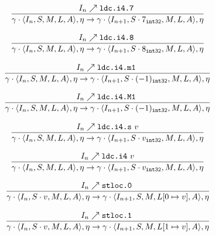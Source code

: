 \documentclass{article}
\numberwithin{equation}{section}
\newcommand{\mstate}[5] {
	\langle#1, #2, #3, #4, #5\rangle
}
\newcommand{\ipointsto}[3] {
	#1 \nearrow \texttt{#2} \text{ } #3
}
\newcommand{\sval}[2] {
	#1_\texttt{#2}
}
\newcommand{\setarrayitem}[3] {
	#1[#2 \mapsto #3]
}
\begin{document}
\begin{equation}
\label{eq:semantics_ldci47}
	\infer{
		\gamma \cdot \mstate{I_n}{S}{M}{L}{A}, \eta
			\rightarrow
		\gamma \cdot \mstate{I_{n+1}}{S \cdot \sval{7}{int32}}{M}{L}{A}, \eta
	}
	{\ipointsto{I_n}{ldc.i4.7}}
\end{equation}

\begin{equation}
\label{eq:semantics_ldci48}
	\infer{
		\gamma \cdot \mstate{I_n}{S}{M}{L}{A}, \eta
			\rightarrow
		\gamma \cdot \mstate{I_{n+1}}{S \cdot \sval{8}{int32}}{M}{L}{A}, \eta
	}
	{\ipointsto{I_n}{ldc.i4.8}}
\end{equation}

\begin{equation}
\label{eq:semantics_ldci4m1}
	\infer{
		\gamma \cdot \mstate{I_n}{S}{M}{L}{A}, \eta
			\rightarrow
		\gamma \cdot \mstate{I_{n+1}}{S \cdot \sval{(-1)}{int32}}{M}{L}{A}, \eta
	}
	{\ipointsto{I_n}{ldc.i4.m1}}
\end{equation}

\begin{equation}
\label{eq:semantics_ldci4M1}
	\infer{
		\gamma \cdot \mstate{I_n}{S}{M}{L}{A}, \eta
			\rightarrow
		\gamma \cdot \mstate{I_{n+1}}{S \cdot \sval{(-1)}{int32}}{M}{L}{A}, \eta
	}
	{\ipointsto{I_n}{ldc.i4.M1}}
\end{equation}

\begin{equation}
\label{eq:semantics_ldci4s}
	\infer{
		\gamma \cdot \mstate{I_n}{S}{M}{L}{A}, \eta
			\rightarrow
		\gamma \cdot \mstate{I_{n+1}}{S \cdot \sval{v}{int32}}{M}{L}{A}, \eta
	}
	{\ipointsto{I_n}{ldc.i4.s}{v}}
\end{equation}

\begin{equation}
\label{eq:semantics_ldci4}
	\infer{
		\gamma \cdot \mstate{I_n}{S}{M}{L}{A}, \eta
			\rightarrow
		\gamma \cdot \mstate{I_{n+1}}{S \cdot \sval{v}{int32}}{M}{L}{A}, \eta
	}
	{\ipointsto{I_n}{ldc.i4}{v}}
\end{equation}

\begin{equation}
\label{eq:semantics_stloc0}
	\infer{
		\gamma \cdot \mstate{I_n}{S \cdot v}{M}{L}{A}, \eta
			\rightarrow
		\gamma \cdot \mstate{I_{n+1}}{S}{M}{\setarrayitem{L}{0}{v}}{A}, \eta
	}
	{\ipointsto{I_n}{stloc.0}}
\end{equation}

\begin{equation}
\label{eq:semantics_stloc1}
	\infer{
		\gamma \cdot \mstate{I_n}{S \cdot v}{M}{L}{A}, \eta
			\rightarrow
		\gamma \cdot \mstate{I_{n+1}}{S}{M}{\setarrayitem{L}{1}{v}}{A}, \eta
	}
	{\ipointsto{I_n}{stloc.1}}
\end{equation}
\end{document}
